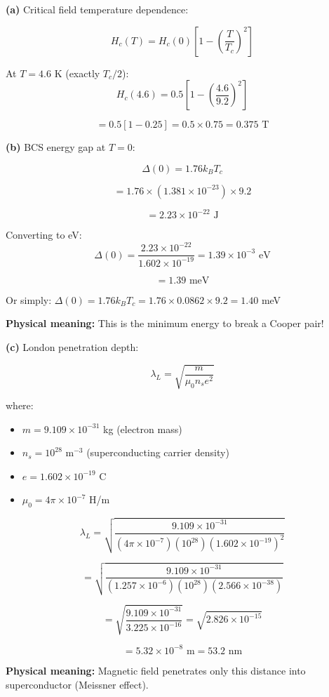 \documentclass[12pt,a4paper]{article}
\begin{document}
\begin{solution}
\textbf{(a)} Critical field temperature dependence:

$$H_c(T) = H_c(0)\left[1 - \left(\frac{T}{T_c}\right)^2\right]$$

At $T = 4.6$ K (exactly $T_c/2$):
$$H_c(4.6) = 0.5\left[1 - \left(\frac{4.6}{9.2}\right)^2\right]$$

$$= 0.5\left[1 - 0.25\right] = 0.5 \times 0.75 = 0.375\text{ T}$$

\textbf{(b)} BCS energy gap at $T = 0$:

$$\Delta(0) = 1.76 k_B T_c$$

$$= 1.76 \times (1.381 \times 10^{-23}) \times 9.2$$

$$= 2.23 \times 10^{-22}\text{ J}$$

Converting to eV:
$$\Delta(0) = \frac{2.23 \times 10^{-22}}{1.602 \times 10^{-19}} = 1.39 \times 10^{-3}\text{ eV}$$

$$= 1.39\text{ meV}$$

Or simply: $\Delta(0) = 1.76 k_B T_c = 1.76 \times 0.0862 \times 9.2 = 1.40$ meV

\textbf{Physical meaning:} This is the minimum energy to break a Cooper pair!

\textbf{(c)} London penetration depth:

$$\lambda_L = \sqrt{\frac{m}{\mu_0 n_s e^2}}$$

where:
\begin{itemize}
    \item $m = 9.109 \times 10^{-31}$ kg (electron mass)
    \item $n_s = 10^{28}$ m$^{-3}$ (superconducting carrier density)
    \item $e = 1.602 \times 10^{-19}$ C
    \item $\mu_0 = 4\pi \times 10^{-7}$ H/m
\end{itemize}

$$\lambda_L = \sqrt{\frac{9.109 \times 10^{-31}}{(4\pi \times 10^{-7})(10^{28})(1.602 \times 10^{-19})^2}}$$

$$= \sqrt{\frac{9.109 \times 10^{-31}}{(1.257 \times 10^{-6})(10^{28})(2.566 \times 10^{-38})}}$$

$$= \sqrt{\frac{9.109 \times 10^{-31}}{3.225 \times 10^{-16}}} = \sqrt{2.826 \times 10^{-15}}$$

$$= 5.32 \times 10^{-8}\text{ m} = 53.2\text{ nm}$$

\textbf{Physical meaning:} Magnetic field penetrates only this distance into superconductor (Meissner effect).


\end{solution}
\end{document}
